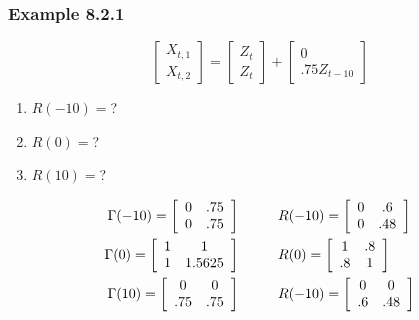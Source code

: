 \documentclass{beamer}
\begin{document}
\begin{frame}
\frametitle{Example 8.2.1}
\[
\left[\begin{array}{c}
X_{t,1} \\
X_{t,2}
\end{array}\right]
=
\left[\begin{array}{c}
Z_{t} \\
Z_{t}
\end{array}\right]
+
\left[\begin{array}{c}
0 \\
.75 Z_{t-10}
\end{array}\right]
\]

\begin{enumerate}
\item $R(-10)=$?
\item $R(0)=$?
\item $R(10)=$?
\end{enumerate}


\begin{align*}
\Gamma(-10) = 
\left[\begin{array}{cc}
0 & .75 \\
0 & .75
\end{array}\right] & \hspace{10mm} R(-10) = 
\left[\begin{array}{cc}
0 & .6 \\
0 & .48
\end{array}\right]\\
\Gamma(0) = 
\left[\begin{array}{cc}
1 & 1 \\
1 & 1.5625
\end{array}\right] & \hspace{10mm} R(0) = 
\left[\begin{array}{cc}
1 & .8 \\
.8 & 1
\end{array}\right]  \\
\Gamma(10) = 
\left[\begin{array}{cc}
0 & 0 \\
.75 & .75
\end{array}\right] & \hspace{10mm} R(-10) = 
\left[\begin{array}{cc}
0 & 0 \\
.6 & .48
\end{array}\right]
\end{align*}




\end{frame}
\end{document}
